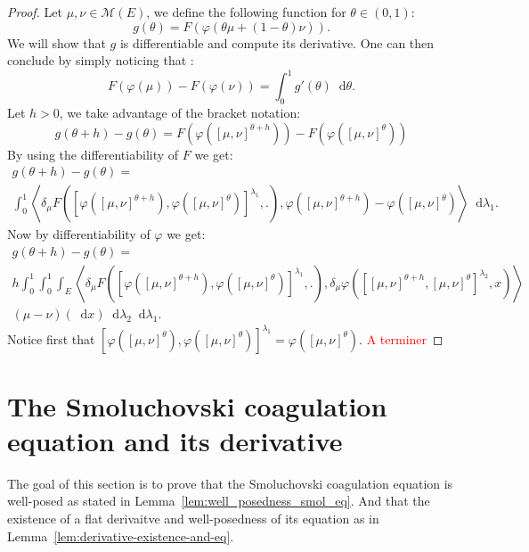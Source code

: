 \documentclass[11pt,a4paper]{article}
\newcommand{\RRP}{\mathbb{R}^+_*}
\newcommand{\MC}{\mathcal{M}}
\newcommand{\red}[1]{\textcolor{red}{#1}}
\newcommand{\brac}[1]{\left\langle#1\right\rangle}
\newcommand{\dd}{\mathop{}\!\mathrm{d}}
\begin{document}
\begin{proof}
    Let $\mu,\nu \in \MC(E)$, we define the following function for $\theta \in (0,1)$:
    \[
        g(\theta) =  F\left(\varphi(\theta\mu + (1 - \theta)\nu)\right).
    \]
    We will show that $g$ is differentiable and compute its derivative. One can then conclude by simply noticing that :
    \[ F(\varphi(\mu)) - F(\varphi(\nu)) = \int_0^1 g'(\theta) \dd \theta.\]
    Let $h > 0$, we take advantage of the bracket notation:
    \[ 
    g(\theta + h) - g(\theta) = F\left(\varphi\left([\mu,\nu]^{\theta + h}\right)\right) -F\left(\varphi\left([\mu,\nu]^{\theta}\right)\right)
    \]
    By using the differentiability of $F$ we get:
    \begin{multline*}
    g(\theta + h) - g(\theta) =\\ \int_0^1 \brac{\delta_\mu F\left(\left[\varphi\left([\mu,\nu]^{\theta + h}\right),\varphi\left([\mu,\nu]^{\theta}\right)\right]^{\lambda_1}, . \right),\varphi\left([\mu,\nu]^{\theta + h}\right) - \varphi\left([\mu,\nu]^{\theta}\right)} \dd \lambda_1.
    \end{multline*}
    Now by differentiability of $\varphi$ we get:
    \begin{multline*}
        g(\theta + h) - g(\theta) =\\
        h\int_0^1 \int_0^1\int_E \brac{\delta_\mu F\left(\left[\varphi\left([\mu,\nu]^{\theta + h}\right),\varphi\left([\mu,\nu]^{\theta}\right)\right]^{\lambda_1}, . \right),\delta_\mu \varphi\left(\left[ [\mu,\nu]^{\theta + h}, [\mu,\nu]^{\theta }\right]^{\lambda_2} ,x\right)}
        \\
        (\mu-\nu)(\dd x) \dd \lambda_2 \dd \lambda_1. 
    \end{multline*}
    Notice first that \(\left[\varphi\left([\mu,\nu]^{\theta}\right),\varphi\left([\mu,\nu]^{\theta}\right)\right]^{\lambda_1} = \varphi\left([\mu,\nu]^{\theta}\right)\).
    \red{A terminer}
\end{proof}

\section{The Smoluchovski coagulation equation and its derivative}\label{section:well-posedness-SCE}
The goal of this section is to prove that the Smoluchovski coagulation equation is well-posed as stated in Lemma~\ref{lem:well_posedness_smol_eq}. And that the existence of a flat derivaitve and well-posedness of its equation as in Lemma~\ref{lem:derivative-existence-and-eq}.
\end{document}
